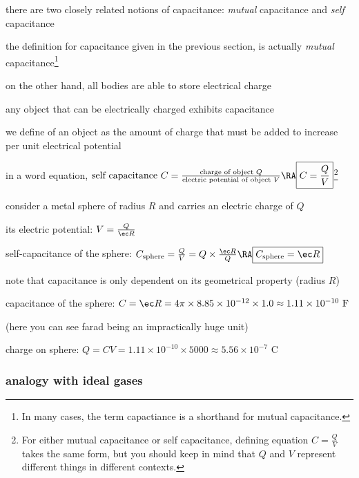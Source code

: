 there are two closely related notions of capacitance: \emph{mutual} capacitance and \emph{self} capacitance

the definition for capacitance given in the previous section, is actually \emph{mutual} capacitance\footnote{In many cases, the term capactiance is a shorthand for mutual capacitance.}

on the other hand, all bodies are able to store electrical charge

any object that can be electrically charged exhibits capacitance

we define  of an object as the amount of charge that must be added to increase per unit electrical potential

in a word equation, $ \text{self capacitance }C=\frac{\text{charge of object }Q}{\text{electric potential of object }V} \RA \boxed{C=\frac{Q}{V}}$\footnote{For either mutual capacitance or self capacitance, defining equation $C=\frac{Q}{V}$ takes the same form, but you should keep in mind that $Q$ and $V$ represent different things in different contexts.}


consider a metal sphere of radius $R$ and carries an electric charge of $Q$

its electric potential: $V = \frac{Q}{\ec R}$

self-capacitance of the sphere: $C_\text{sphere} = \frac{Q}{V} = Q \times \frac{\ec R}{Q} \RA \boxed{C_\text{sphere} = \ec R}$

note that capacitance is only dependent on its geometrical property (radius $R$) \eoe


\sol capacitance of the sphere: $C = \ec R = 4\pi\times8.85\times10^{-12}\times 1.0 \approx 1.11\times10^{-10} \text{ F}$

(here you can see farad being an impractically huge unit)

charge on sphere: $Q = CV = 1.11\times10^{-10} \times 5000 \approx 5.56\times 10^{-7} \text{ C}$ \eoe

\subsubsection*{analogy with ideal gases}

